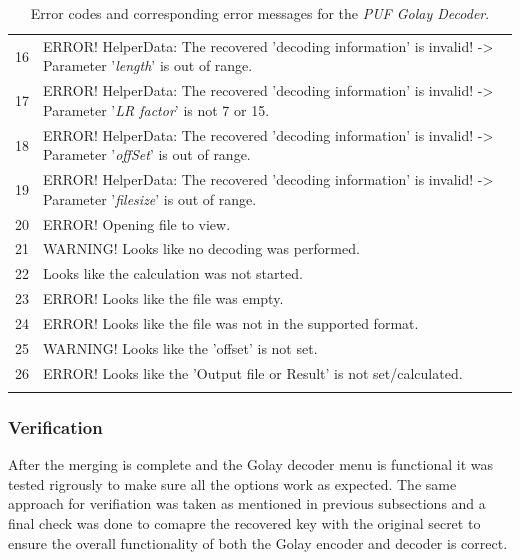 \begin{table}[!ht]
\begin{center}
\begin{tabular}{cp{13cm}}
16 & ERROR! HelperData: The recovered 'decoding information' is invalid! -> Parameter '\emph{length}' is out of range.\\

17 & ERROR! HelperData: The recovered 'decoding information' is invalid! -> Parameter '\emph{LR factor}' is not 7 or 15.\\

18 & ERROR! HelperData: The recovered 'decoding information' is invalid! -> Parameter '\emph{offSet}' is out of range.\\

19 & ERROR! HelperData: The recovered 'decoding information' is invalid! -> Parameter '\emph{filesize}' is out of range.\\

20 & ERROR! Opening file to view.\\

21 & WARNING! Looks like no decoding was performed.\\

22 & Looks like the calculation was not started.\\

23 & ERROR! Looks like the file was empty.\\

24 & ERROR! Looks like the file was not in the supported format.\\

25 & WARNING! Looks like the 'offset' is not set.\\

26 & ERROR! Looks like the 'Output file or Result' is not set/calculated.\\
\addlinespace
\bottomrule
\end{tabular}
\end{center}
\caption{Error codes and corresponding error messages for the \emph{PUF Golay Decoder}.}
\label{tab:Golay_dec_errors}
\end{table}

\subsubsection{Verification}
After the merging is complete and the Golay decoder menu is functional it was tested rigrously to make sure all the options work as expected. The same approach for verifiation was taken as mentioned in previous subsections and a final check was done to comapre the recovered key with the original secret to ensure the overall functionality of both the Golay encoder and decoder is correct.

